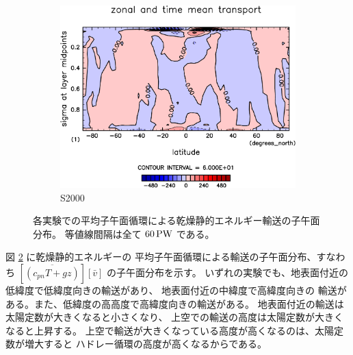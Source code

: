 \documentclass[body]{subfiles}
\begin{document}
\begin{figure}[t]
\begin{subfigure}{.4\textwidth}
		\centering
		\includegraphics[width=\columnwidth]{S2000/MeriHeatTransTest@dryStatEn_M,time=7300:7665-crop-rotate.pdf}
		\caption{S2000}\label{乾燥静的エネルギー平均子午面循環S2000}
	\end{subfigure}
	\caption[各実験での平均子午面循環による乾燥静的エネルギー輸送の子午面分布]{
		各実験での平均子午面循環による乾燥静的エネルギー輸送の子午面分布。
		等値線間隔は全て \(60\hmu{PW}\) である。
	}\label{乾燥静的エネルギー平均子午面循環}
\end{figure}

図 \ref{乾燥静的エネルギー平均子午面循環} に乾燥静的エネルギーの
平均子午面循環による輸送の子午面分布、すなわち 
\([\overline{(c_{pn}T+gz)}][\bar v]\) の子午面分布を示す。
いずれの実験でも、地表面付近の低緯度で低緯度向きの輸送があり、
地表面付近の中緯度で高緯度向きの
輸送がある。また、低緯度の高高度で高緯度向きの輸送がある。
地表面付近の輸送は太陽定数が大きくなると小さくなり、
上空での輸送の高度は太陽定数が大きくなると上昇する。
上空で輸送が大きくなっている高度が高くなるのは、太陽定数が増大すると
ハドレー循環の高度が高くなるからである。
\end{document}
